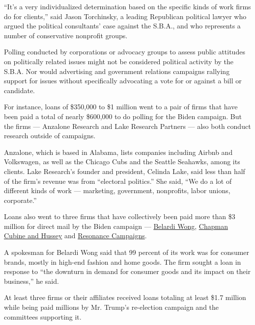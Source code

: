 ``It's a very individualized determination based on the specific kinds
of work firms do for clients,'' said Jason Torchinsky, a leading
Republican political lawyer who argued the political consultants' case
against the S.B.A., and who represents a number of conservative
nonprofit groups.

Polling conducted by corporations or advocacy groups to assess public
attitudes on politically related issues might not be considered
political activity by the S.B.A. Nor would advertising and government
relations campaigns rallying support for issues without specifically
advocating a vote for or against a bill or candidate.

For instance, loans of \$350,000 to \$1 million went to a pair of firms
that have been paid a total of nearly \$600,000 to do polling for the
Biden campaign. But the firms --- Anzalone Research and Lake Research
Partners --- also both conduct research outside of campaigns.

Anzalone, which is based in Alabama, lists companies including Airbnb
and Volkswagen, as well as the Chicago Cubs and the Seattle Seahawks,
among its clients. Lake Research's founder and president, Celinda Lake,
said less than half of the firm's revenue was from ``electoral
politics.'' She said, ``We do a lot of different kinds of work ---
marketing, government, nonprofits, labor unions, corporate.''

Loans also went to three firms that have collectively been paid more
than \$3 million for direct mail by the Biden campaign ---
\href{https://www.fec.gov/data/disbursements/?cycle=2020\&data_type=processed\&committee_id=C00703975\&recipient_name=Belardi+Wong+\&two_year_transaction_period=2020\&line_number=F3P-23}{Belardi
Wong},
\href{https://www.fec.gov/data/disbursements/?cycle=2020\&data_type=processed\&committee_id=C00703975\&recipient_name=Chapman\%2C+Cubine\&two_year_transaction_period=2020\&line_number=F3P-23}{Chapman
Cubine and Hussey} and
\href{https://www.fec.gov/data/disbursements/?cycle=2020\&data_type=processed\&committee_id=C00703975\&recipient_name=RESONANCE+CAMPAIGNS\&two_year_transaction_period=2020\&line_number=F3P-23}{Resonance
Campaigns}.

A spokesman for Belardi Wong said that 99 percent of its work was for
consumer brands, mostly in high-end fashion and home goods. The firm
sought a loan in response to ``the downturn in demand for consumer goods
and its impact on their business,'' he said.

At least three firms or their affiliates received loans totaling at
least \$1.7 million while being paid millions by Mr. Trump's re-election
campaign and the committees supporting it.

